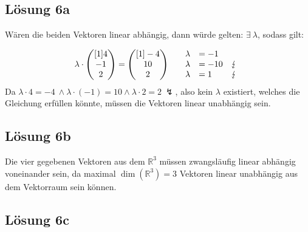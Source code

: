 \documentclass[main.tex]{subfiles}
\begin{document}
\subsection{Lösung 6a}

Wären die beiden Vektoren linear abhängig, dann würde gelten: $\exists \ \lambda $, sodass gilt:

\begin{equation*}
    \lambda \cdotp \begin{pmatrix}[1]
    4\\
    -1\\
    2
    \end{pmatrix} =\begin{pmatrix}[1]
    -4\\
    10\\
    2
    \end{pmatrix} \ \begin{array}{ r r l c }
    & \lambda  & =-1 & \\
    & \lambda  & =-10 & \lightning \\
    & \lambda  & =1 & \lightning 
    \end{array}
\end{equation*}
Da $\lambda \cdotp 4=-4\ \land \lambda \cdotp ( -1) =10\land \lambda \cdotp 2=2\ \lightning $, also kein $\lambda $ existiert, welches die Gleichung erfüllen könnte, müssen die Vektoren linear unabhängig sein.


\subsection{Lösung 6b}

Die vier gegebenen Vektoren aus dem $\mathbb{R}^{3}$ müssen zwangsläufig linear abhängig voneinander sein, da maximal $\dim\left(\mathbb{R}^{3}\right) =3$ Vektoren linear unabhängig aus dem Vektorraum sein können. 

\subsection{Lösung 6c}
\end{document}
